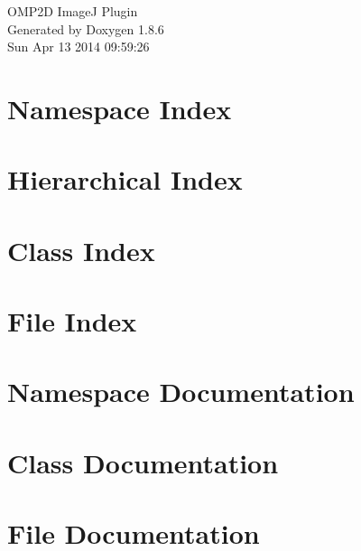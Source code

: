 \documentclass[twoside]{book}
\newcommand{\clearemptydoublepage}{%
  \newpage{\pagestyle{empty}\cleardoublepage}%
}
\begin{document}
\hypersetup{pageanchor=false}
\begin{titlepage}
\vspace*{7cm}
\begin{center}%
{\Large O\-M\-P2\-D Image\-J Plugin }\\
\vspace*{1cm}
{\large Generated by Doxygen 1.8.6}\\
\vspace*{0.5cm}
{\small Sun Apr 13 2014 09:59:26}\\
\end{center}
\end{titlepage}
\clearemptydoublepage
\tableofcontents
\clearemptydoublepage
{}
\hypersetup{pageanchor=true}

\chapter{Namespace Index}

\chapter{Hierarchical Index}

\chapter{Class Index}

\chapter{File Index}

\chapter{Namespace Documentation}



\chapter{Class Documentation}











\chapter{File Documentation}














\newpage
{}
{}
\printindex
\end{document}
